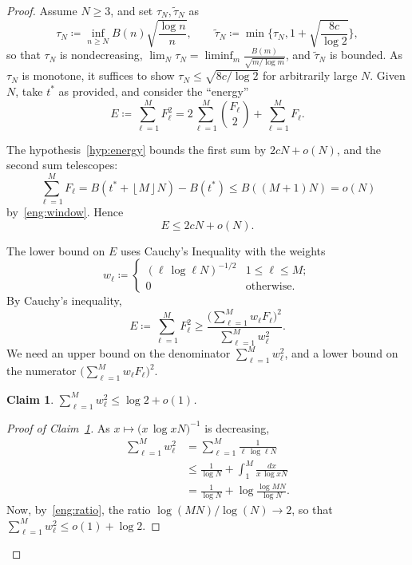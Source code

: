 \documentclass[10pt]{article}
\newcommand{\floor}[1]{\mbox{$\left\lfloor #1 \right\rfloor$}}
\newtheorem{claim}[thm]{Claim}
\begin{document}
\begin{proof}
Assume $N\ge 3$, and set $\tau_N,\widetilde{\tau}_N$ as
  \begin{equation}\label{def tau}
    \tau_N \coloneqq \inf_{n\ge N} B(n)\sqrt{\frac{\log n}{n}},
    \qquad 
    \widetilde{\tau}_N \coloneqq \min\{\tau_N , 1+\sqrt{\frac{8c}{\log 2}}\},
  \end{equation}
so that $\tau_N$ is nondecreasing, $\lim_N\tau_N=\liminf_m \frac{B(m)}{\sqrt{m/\log m}}$, and $\widetilde{\tau}_N$ is bounded.
As $\tau_N$ is monotone, it suffices to show $\tau_N\le
\sqrt{8c/\log2}$ for arbitrarily large $N$. 
Given $N$, take $t^\ast$ as provided, and consider the ``energy''
  \[E\coloneqq \sum_{\ell=1}^{M}F_\ell^2
      =2\sum_{\ell=1}^{M}\binom{F_\ell}{2}+\sum_{\ell=1}^{M}F_\ell.\]

The hypothesis~\eqref{hyp:energy} bounds the first sum by $2cN+o(N)$, and the second sum telescopes:
  \[\sum_{\ell=1}^{M}F_\ell=B(t^\ast+\floor{M}N)-B(t^\ast)\le B((M+1)N) = o(N)\]
by~\ref{eng:window}. Hence 
\begin{equation}\label{eq:upper}
  E\le 2cN+o(N).
\end{equation}

The lower bound on $E$ uses Cauchy's Inequality with the weights
\[
   w_\ell\coloneqq \begin{cases}
    \left( \ell\,\log \ell N \right)^{-1/2} & 1\le\ell\le M; \\
    0 & \text{otherwise.}
   \end{cases}
\]
By Cauchy's inequality,
\begin{equation}\label{eq:CS}
   E \coloneqq \sum_{\ell=1}^{M}F_\ell^{2}
   \ge \frac{\bigl(\sum_{\ell=1}^{M}w_\ell F_\ell\bigr)^{2}}
           {\sum_{\ell=1}^{M}w_\ell^{2}} .
\end{equation}
We need an upper bound on the denominator ${\sum_{\ell=1}^{M}w_\ell^{2}}$, and a lower bound on the numerator $\bigl(\sum_{\ell=1}^{M}w_\ell F_\ell\bigr)^{2}$.

\begin{claim}\label{eq:den}
    \(\displaystyle {\sum_{\ell=1}^{M}w_\ell^{2}} \le \log 2 + o(1)\).
\end{claim}
\begin{proof}[Proof of Claim~\ref{eq:den}]
As $x\mapsto\bigl(x\,\log xN \bigr)^{-1}$ is decreasing,
\begin{align*}
   \sum_{\ell=1}^{M}w_\ell^{2}
   &=\sum_{\ell=1}^{M}\frac{1}{\ell\,\log \ell N}\\
   &\le\frac{1}{\log N}+\int_{1}^{M}\frac{dx}{x\,\log xN}\\
   &=\frac{1}{\log N}+\log\frac{\log MN}{\log N}.
\end{align*}
Now, by~\ref{eng:ratio}, the ratio $\log(MN)/\log(N)\to 2$, so that 
  \(   \sum_{\ell=1}^{M}w_\ell^{2}\le o(1)+\log 2.\)
\end{proof}


\end{proof}
\end{document}
